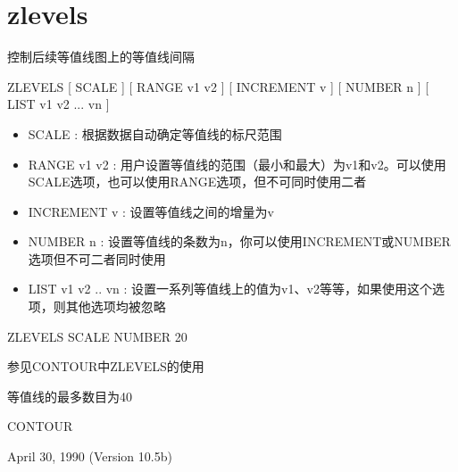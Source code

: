 \section{zlevels}
\label{cmd:zlevels}

控制后续等值线图上的等值线间隔

ZLEVELS [ SCALE ] [ RANGE v1 v2 ] [ INCREMENT v ] [ NUMBER n ] [ LIST v1 v2 ... vn ]

\begin{itemize}
\item SCALE : 根据数据自动确定等值线的标尺范围 
\item RANGE v1 v2 : 用户设置等值线的范围（最小和最大）为v1和v2。可以使用SCALE选项，也可以使用RANGE选项，但不可同时使用二者 
\item INCREMENT v : 设置等值线之间的增量为v 
\item NUMBER n :  设置等值线的条数为n，你可以使用INCREMENT或NUMBER选项但不可二者同时使用 
\item LIST v1 v2 .. vn : 设置一系列等值线上的值为v1、v2等等，如果使用这个选项，则其他选项均被忽略 
\end{itemize}

ZLEVELS SCALE NUMBER 20

参见CONTOUR中ZLEVELS的使用

等值线的最多数目为40

CONTOUR

April 30, 1990 (Version 10.5b)
